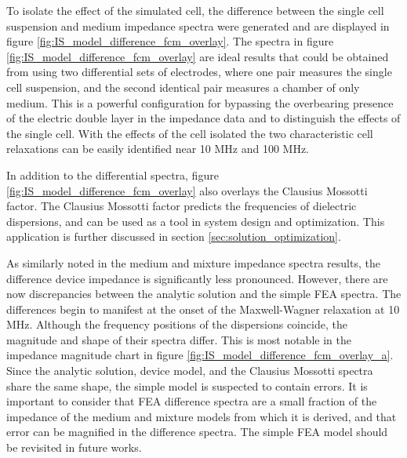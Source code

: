 \par To isolate the effect of the simulated cell, the difference between the single cell suspension and medium impedance spectra were generated and are displayed in figure \ref{fig:IS_model_difference_fcm_overlay}. The spectra in figure \ref{fig:IS_model_difference_fcm_overlay} are ideal results that could be obtained from using two differential sets of electrodes, where one pair measures the single cell suspension, and the second identical pair measures a chamber of only medium. This is a powerful configuration for bypassing the overbearing presence of the electric double layer in the impedance data and to distinguish the effects of the single cell. With the effects of the cell isolated the two characteristic cell relaxations can be easily identified near 10 MHz and 100 MHz.

\par In addition to the differential spectra, figure \ref{fig:IS_model_difference_fcm_overlay} also overlays the Clausius Mossotti factor. The Clausius Mossotti factor predicts the frequencies of dielectric dispersions, and can be used as a tool in system design and optimization. This application is further discussed in section \ref{sec:solution_optimization}.

\par As similarly noted in the medium and mixture impedance spectra results, the difference device impedance is significantly less pronounced. However, there are now discrepancies between the analytic solution and the simple FEA spectra. The differences begin to manifest at the onset of the Maxwell-Wagner relaxation at 10 MHz. Although the frequency positions of the dispersions coincide, the magnitude and shape of their spectra differ. This is most notable in the impedance magnitude chart in figure \ref{fig:IS_model_difference_fcm_overlay_a}. Since the analytic solution, device model, and the Clausius Mossotti spectra share the same shape, the simple model is suspected to contain errors. It is important to consider that FEA difference spectra are a small fraction of the impedance of the medium and mixture models from which it is derived, and that error can be magnified in the difference spectra. The simple FEA model should be revisited in future works.


